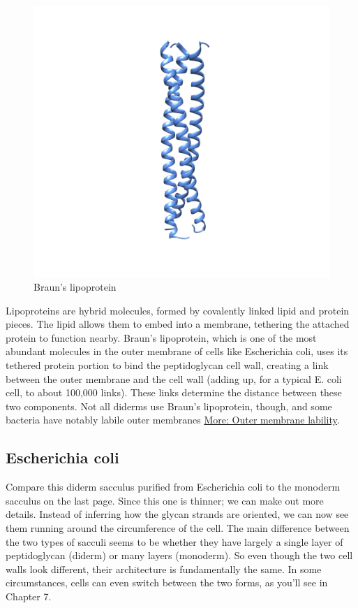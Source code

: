 \documentclass[]{tufte-book}
\begin{document}
\begin{figure}
\includegraphics{img/02_schematic/2_3_1_BLP} \caption[Braun's lipoprotein]{Braun's lipoprotein}\label{fig:2-3-1}
\end{figure}

Lipoproteins are hybrid molecules, formed by covalently linked lipid and protein pieces. The lipid allows them to embed into a membrane, tethering the attached protein to function nearby. Braun's lipoprotein, which is one of the most abundant molecules in the outer membrane of cells like Escherichia coli, uses its tethered protein portion to bind the peptidoglycan cell wall, creating a link between the outer membrane and the cell wall (adding up, for a typical E. coli cell, to about 100,000 links). These links determine the distance between these two components. Not all diderms use Braun's lipoprotein, though, and some bacteria have notably labile outer membranes \protect\hyperlink{}{More: Outer membrane lability}.

\hypertarget{Diderm_sacculus_architecture}{%
\subsection{Escherichia coli}\label{Diderm_sacculus_architecture}}

Compare this diderm sacculus purified from Escherichia coli to the monoderm sacculus on the last page. Since this one is thinner; we can make out more details. Instead of inferring how the glycan strands are oriented, we can now see them running around the circumference of the cell. The main difference between the two types of sacculi seems to be whether they have largely a single layer of peptidoglycan (diderm) or many layers (monoderm). So even though the two cell walls look different, their architecture is fundamentally the same. In some circumstances, cells can even switch between the two forms, as you'll see in Chapter 7.
\end{document}
